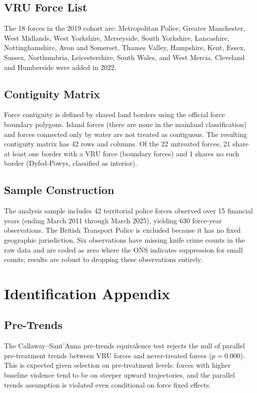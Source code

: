 \documentclass[12pt]{article}
\begin{document}
\subsection{VRU Force List}

The 18 forces in the 2019 cohort are: Metropolitan Police, Greater Manchester, West Midlands, West Yorkshire, Merseyside, South Yorkshire, Lancashire, Nottinghamshire, Avon and Somerset, Thames Valley, Hampshire, Kent, Essex, Sussex, Northumbria, Leicestershire, South Wales, and West Mercia. Cleveland and Humberside were added in 2022.

\subsection{Contiguity Matrix}

Force contiguity is defined by shared land borders using the official force boundary polygons. Island forces (there are none in the mainland classification) and forces connected only by water are not treated as contiguous. The resulting contiguity matrix has 42 rows and columns. Of the 22 untreated forces, 21 share at least one border with a VRU force (boundary forces) and 1 shares no such border (Dyfed-Powys, classified as interior).

\subsection{Sample Construction}

The analysis sample includes 42 territorial police forces observed over 15 financial years (ending March 2011 through March 2025), yielding 630 force-year observations. The British Transport Police is excluded because it has no fixed geographic jurisdiction. Six observations have missing knife crime counts in the raw data and are coded as zero where the ONS indicates suppression for small counts; results are robust to dropping these observations entirely.

\section{Identification Appendix}
\label{app:identification}

\subsection{Pre-Trends}

The Callaway--Sant'Anna pre-trends equivalence test rejects the null of parallel pre-treatment trends between VRU forces and never-treated forces ($p = 0.000$). This is expected given selection on pre-treatment levels: forces with higher baseline violence tend to be on steeper upward trajectories, and the parallel trends assumption is violated even conditional on force fixed effects.
\end{document}
